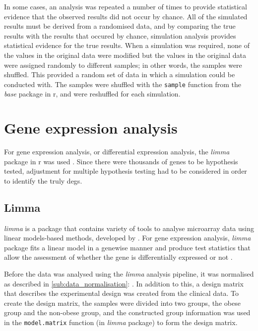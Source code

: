 In some cases, an analysis was repeated a number of times to provide statistical evidence that the observed results did not occur by chance.
All of the simulated results must be derived from a randomised data, and by comparing the true results with the results that occured by chance, simulation analysis provides statistical evidence for the true results.
When a simulation was required, none of the values in the original data were modified but the values in the original data were assigned randomly to different samples; in other words, the samples were shuffled.
This provided a random set of data in which a simulation could be conducted with.
The samples were shuffled with the \texttt{sample} function from the \textit{base} package in \gls{r}, and were reshuffled for each simulation.

\section{Gene expression analysis}
\label{sec:gene_expression_analysis}

For gene expression analysis, or differential expression analysis, the \textit{limma} package in \gls{r} was used \citep{Ritchie2015}.
Since there were thousands of genes to be hypothesis tested, adjustment for multiple hypothesis testing had to be considered in order to identify the truly \glspl{deg}.

\subsection{Limma}
\label{sub:limma}

\textit{limma} is a package that contains variety of tools to analyse microarray data using linear models-based methods, developed by \citet{Ritchie2015}.
For gene expression analysis, \textit{limma} package fits a linear model in a genewise manner and produce test statistics that allow the assessment of whether the gene is differentially expressed or not \citep{Ritchie2015}.

Before the data was analysed using the \textit{limma} analysis pipeline, it was normalised as described in \cref{sub:data_normalisation}: .
In addition to this, a design matrix that describes the experimental design was created from the clinical data.
To create the design matrix, the samples were divided into two groups, the obese group and the non-obese group, and the constructed group information was used in the \texttt{model.matrix} function (in \textit{limma} package) to form the design matrix.


